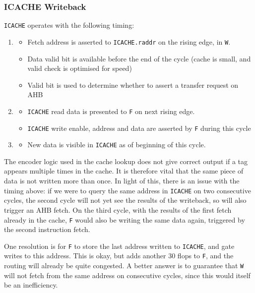 \documentclass{article}
\begin{document}
\subsubsection{ICACHE Writeback}

\texttt{ICACHE} operates with the following timing:

\begin{enumerate}
	\item
	\begin{itemize}
		\item Fetch address is asserted to \texttt{ICACHE.raddr} on the rising edge, in \texttt{W}.
		\item Data valid bit is available before the end of the cycle (cache is small, and valid check is optimised for speed)
		\item Valid bit is used to determine whether to assert a transfer request on AHB
	\end{itemize}
	\item
	\begin{itemize}
		\item \texttt{ICACHE} read data is presented to \texttt{F} on next rising edge.
		\item \texttt{ICACHE} write enable, address and data are asserted by \texttt{F} during this cycle
	\end{itemize}
	\item
	\begin{itemize}
		\item New data is visible in \texttt{ICACHE} as of beginning of this cycle.
	\end{itemize}
\end{enumerate}

The encoder logic used in the cache lookup does not give correct output if a tag appears multiple times in the cache. It is therefore vital that the same piece of data is not written more than once. In light of this, there is an issue with the timing above: if we were to query the same address in \texttt{ICACHE} on two consecutive cycles, the second cycle will not yet see the results of the writeback, so will also trigger an AHB fetch. On the third cycle, with the results of the first fetch already in the cache, \texttt{F} would also be writing the same data again, triggered by the second instruction fetch.

One resolution is for \texttt{F} to store the last address written to \texttt{ICACHE}, and gate writes to this address. This is okay, but adds another 30 flops to \texttt{F}, and the routing will already be quite congested. A better answer is to guarantee that \texttt{W} will not fetch from the same address on consecutive cycles, since this would itself be an inefficiency.
\end{document}

